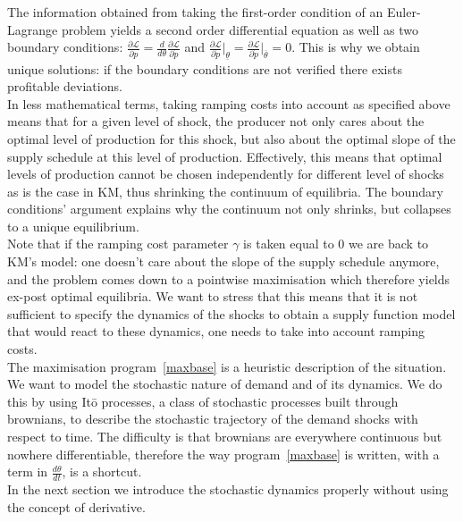 The information obtained from taking the first-order condition of an Euler-Lagrange problem yields a second order differential equation as well as two boundary conditions: $\frac{\partial\mathcal{L}}{\partial p}=\frac{d}{d\theta}\frac{\partial\mathcal{L}}{\partial \dot{p}}$ and $\frac{\partial\mathcal{L}}{\partial\dot{p}}\big|_{\underline{\theta}}=\frac{\partial\mathcal{L}}{\partial\dot{p}}\big|_{\overline{\theta}}=0$. This is why we obtain unique solutions: if the boundary conditions are not verified there exists profitable deviations. \\

In less mathematical terms, taking ramping costs into account as specified above means that for a given level of shock, the producer not only cares about the optimal level of production for this shock, but also about the optimal slope of the supply schedule at this level of production. Effectively, this means that optimal levels of production cannot be chosen independently for different level of shocks as is the case in KM, thus shrinking the continuum of equilibria. The boundary conditions' argument explains why the continuum not only shrinks, but collapses to a unique equilibrium. \\

Note that if the ramping cost parameter $\gamma$ is taken equal to $0$ we are back to KM's model: one doesn't care about the slope of the supply schedule anymore, and the problem comes down to a pointwise maximisation which therefore yields ex-post optimal equilibria. We want to stress that this means that it is not sufficient to specify the dynamics of the shocks to obtain a supply function model that would react to these dynamics, one needs to take into account ramping costs.\\

The maximisation program~\ref{maxbase} is a heuristic description of the situation. We want to model the stochastic nature of demand and of its dynamics. We do this by using It\={o} processes, a class of stochastic processes built through brownians, to describe the stochastic trajectory of the demand shocks with respect to time. The difficulty is that brownians are everywhere continuous but nowhere differentiable, therefore the way program~\ref{maxbase} is written, with a term in $\frac{d\theta}{dt}$, is a shortcut.\\

In the next section we introduce the stochastic dynamics properly without using the concept of derivative. 


